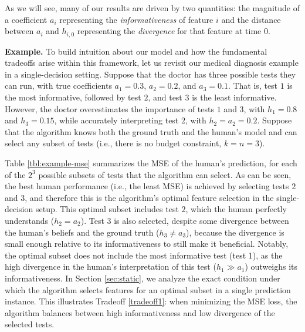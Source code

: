 As we will see, many of our results are driven by two quantities: the magnitude of a coefficient $a_i$ representing the {\em informativeness} of feature $i$ and the distance between $a_i$ and $h_{i,0}$ representing the {\em divergence} for that feature at time $0$. %











\vspace{5pt} \noindent  \textbf{Example.}
To build intuition about our model and how the fundamental tradeoffs arise within this framework, let us revisit our medical diagnosis example in a single-decision setting. Suppose that the doctor has three possible tests they can run, with true coefficients $a_1=0.3$, $a_2=0.2$, and $a_3=0.1$. That is, test $1$ is the most informative, followed by test $2$, and test $3$ is the least informative. However, the doctor overestimates the importance of tests $1$ and $3$, with $h_1=0.8$ and $h_3=0.15$, while accurately interpreting test $2$, with $h_2=a_2=0.2$. Suppose that the algorithm knows both the ground truth and the human's model and can select any subset of tests (i.e., there is no budget constraint, $k=n=3$).

Table \ref{tbl:example-mse} summarizes the MSE of the human's prediction, for each of the $2^3$ possible subsets of tests that the algorithm can select. %
As can be seen, the best human performance (i.e., the least MSE) is achieved by selecting tests $2$ and $3$, and therefore this is the algorithm's optimal feature selection in the single-decision setup. 
This optimal subset includes test $2$, which the human perfectly understands ($h_2 = a_2$).
Test $3$ is also selected, despite some divergence between the human's beliefs and the ground truth ($h_3 \neq a_3$), because the divergence is small enough relative to its informativeness to still make it beneficial. 
Notably, the optimal subset does not include the most informative test (test 1), as the high divergence in the human's interpretation of this test ($h_1 \gg a_1$) outweighs its informativeness. 
  {In Section \ref{sec:static}, we analyze the exact condition under which 
  the algorithm selects features for an optimal subset in a single prediction instance.} 
This illustrates Tradeoff \ref{tradeoff1}: when minimizing the MSE loss, the algorithm balances between high informativeness and low divergence of the selected tests.







